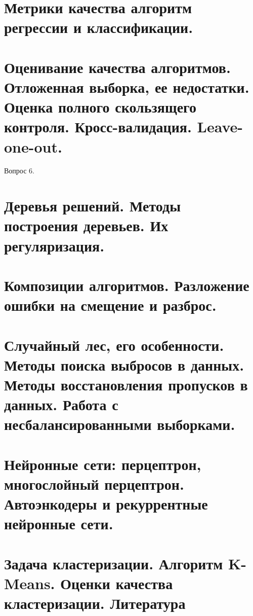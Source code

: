 \begin{multicols}{2}
    \section{Метрики качества алгоритм регрессии и классификации.}

    \section{Оценивание качества алгоритмов. Отложенная выборка, ее недостатки. Оценка полного
    скользящего контроля. Кросс-валидация. Leave-one-out.}
    Вопрос 6.
    \section{Деревья решений. Методы построения деревьев. Их регуляризация.}

    \section{Композиции алгоритмов. Разложение ошибки на смещение и разброс.}
    \columnbreak
    \section{Случайный лес, его особенности. Методы поиска выбросов в данных. Методы
    восстановления пропусков в данных. Работа с несбалансированными выборками.}

    \section{Нейронные сети: перцептрон, многослойный перцептрон. Автоэнкодеры и
    рекуррентные нейронные сети.}

    \section{Задача кластеризации. Алгоритм K-Means. Оценки качества кластеризации.
    Литература
    }
\end{multicols}